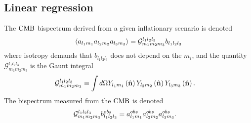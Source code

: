     \subsection{Linear regression}
    The $\text{CMB}$ bispectrum derived from a given inflationary scenario is denoted
    \begin{align}
        \left<a_{l_1m_1}a_{l_2m_2}a_{l_3m_3}\right> = \mathcal{G}^{l_1l_2l_3}_{m_1m_2m_3}b_{l_1l_2l_3}
    \end{align}
    where isotropy demands that $b_{l_1l_2l_3}$ does not depend on the $m_i$,
    and the quantity $\mathcal{G}^{l_1l_2l_3}_{m_1m_2m_3}$ is the Gaunt integral
    \begin{align}
        \mathcal{G}^{l_1l_2l_3}_{m_1m_2m_3} &\equiv \int d\Omega Y_{l_1m_1}\nhatbrkt Y_{l_2m_2}\nhatbrkt Y_{l_3m_3}\nhatbrkt. %
    \end{align}
    The bispectrum measured from the $\text{CMB}$ is denoted
    \begin{align}
        \mathcal{G}^{l_1l_2l_3}_{m_1m_2m_3}b^{obs}_{l_1l_2l_3} &= a^{obs}_{l_1m_1}a^{obs}_{l_2m_2}a^{obs}_{l_3m_3}.
    \end{align}


